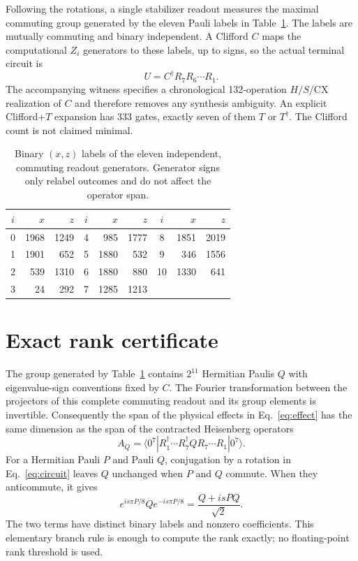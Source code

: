 \documentclass[aps,pra,reprint,floatfix,superscriptaddress,nofootinbib]{revtex4-2}
\begin{document}
Following the rotations, a single stabilizer readout measures the maximal commuting group generated by the eleven Pauli labels in Table~\ref{tab:readout}. The labels are mutually commuting and binary independent. A Clifford $C$ maps the computational $Z_i$ generators to these labels, up to signs, so the actual terminal circuit is
\begin{equation}
 U=C^\dagger R_7R_6\cdots R_1.
 \label{eq:circuit}
\end{equation}
The accompanying witness specifies a chronological 132-operation $H/S/\mathrm{CX}$ realization of $C$ and therefore removes any synthesis ambiguity. An explicit Clifford+$T$ expansion has 333 gates, exactly seven of them $T$ or $T^\dagger$. The Clifford count is not claimed minimal.

\begin{table}[t]
\caption{Binary $(x,z)$ labels of the eleven independent, commuting readout generators. Generator signs only relabel outcomes and do not affect the operator span.}
\label{tab:readout}
\begin{ruledtabular}
\begin{tabular}{c r r@{\qquad}c r r@{\qquad}c r r}
$i$&$x$&$z$&$i$&$x$&$z$&$i$&$x$&$z$\\
\hline
0&1968&1249&4&985&1777&8&1851&2019\\
1&1901&652&5&1880&532&9&346&1556\\
2&539&1310&6&1880&880&10&1330&641\\
3&24&292&7&1285&1213&&&
\end{tabular}
\end{ruledtabular}
\end{table}

\section{Exact rank certificate}

The group generated by Table~\ref{tab:readout} contains $2^{11}$ Hermitian Paulis $Q$ with eigenvalue-sign conventions fixed by $C$. The Fourier transformation between the projectors of this complete commuting readout and its group elements is invertible. Consequently the span of the physical effects in Eq.~\eqref{eq:effect} has the same dimension as the span of the contracted Heisenberg operators
\begin{equation}
 A_Q=\langle0^7|R_1^\dagger\cdots R_7^\dagger Q R_7\cdots R_1|0^7\rangle.
 \label{eq:contract}
\end{equation}
For a Hermitian Pauli $P$ and Pauli $Q$, conjugation by a rotation in Eq.~\eqref{eq:circuit} leaves $Q$ unchanged when $P$ and $Q$ commute. When they anticommute, it gives
\begin{equation}
 e^{is\pi P/8}Qe^{-is\pi P/8}=\frac{Q+isPQ}{\sqrt 2}.
 \label{eq:branch}
\end{equation}
The two terms have distinct binary labels and nonzero coefficients. This elementary branch rule is enough to compute the rank exactly; no floating-point rank threshold is used.
\end{document}

